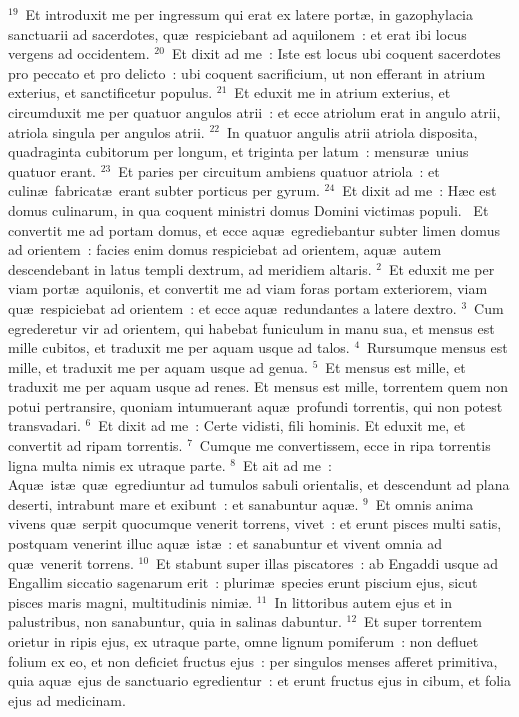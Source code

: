 ${}^{19}$~Et introduxit me per ingressum qui erat ex latere port\ae , in gazophylacia sanctuarii ad sacerdotes, qu\ae\ respiciebant ad aquilonem~: et erat ibi locus vergens ad occidentem.
${}^{20}$~Et dixit ad me~: Iste est locus ubi coquent sacerdotes pro peccato et pro delicto~: ubi coquent sacrificium, ut non efferant in atrium exterius, et sanctificetur populus.
${}^{21}$~Et eduxit me in atrium exterius, et circumduxit me per quatuor angulos atrii~: et ecce atriolum erat in angulo atrii, atriola singula per angulos atrii.
${}^{22}$~In quatuor angulis atrii atriola disposita, quadraginta cubitorum per longum, et triginta per latum~: mensur\ae\ unius quatuor erant.
${}^{23}$~Et paries per circuitum ambiens quatuor atriola~: et culin\ae\ fabricat\ae\ erant subter porticus per gyrum.
${}^{24}$~Et dixit ad me~: H\ae c est domus culinarum, in qua coquent ministri domus Domini victimas populi.
~Et convertit me ad portam domus, et ecce aqu\ae\ egrediebantur subter limen domus ad orientem~: facies enim domus respiciebat ad orientem, aqu\ae\ autem descendebant in latus templi dextrum, ad meridiem altaris.
${}^{2}$~Et eduxit me per viam port\ae\ aquilonis, et convertit me ad viam foras portam exteriorem, viam qu\ae\ respiciebat ad orientem~: et ecce aqu\ae\ redundantes a latere dextro.
${}^{3}$~Cum egrederetur vir ad orientem, qui habebat funiculum in manu sua, et mensus est mille cubitos, et traduxit me per aquam usque ad talos.
${}^{4}$~Rursumque mensus est mille, et traduxit me per aquam usque ad genua.
${}^{5}$~Et mensus est mille, et traduxit me per aquam usque ad renes. Et mensus est mille, torrentem quem non potui pertransire, quoniam intumuerant aqu\ae\ profundi torrentis, qui non potest transvadari.
${}^{6}$~Et dixit ad me~: Certe vidisti, fili hominis. Et eduxit me, et convertit ad ripam torrentis.
${}^{7}$~Cumque me convertissem, ecce in ripa torrentis ligna multa nimis ex utraque parte.
${}^{8}$~Et ait ad me~: Aqu\ae\ ist\ae\ qu\ae\ egrediuntur ad tumulos sabuli orientalis, et descendunt ad plana deserti, intrabunt mare et exibunt~: et sanabuntur aqu\ae .
${}^{9}$~Et omnis anima vivens qu\ae\ serpit quocumque venerit torrens, vivet~: et erunt pisces multi satis, postquam venerint illuc aqu\ae\ ist\ae~: et sanabuntur et vivent omnia ad qu\ae\ venerit torrens.
${}^{10}$~Et stabunt super illas piscatores~: ab Engaddi usque ad Engallim siccatio sagenarum erit~: plurim\ae\ species erunt piscium ejus, sicut pisces maris magni, multitudinis nimi\ae .
${}^{11}$~In littoribus autem ejus et in palustribus, non sanabuntur, quia in salinas dabuntur.
${}^{12}$~Et super torrentem orietur in ripis ejus, ex utraque parte, omne lignum pomiferum~: non defluet folium ex eo, et non deficiet fructus ejus~: per singulos menses afferet primitiva, quia aqu\ae\ ejus de sanctuario egredientur~: et erunt fructus ejus in cibum, et folia ejus ad medicinam.


